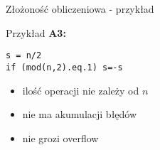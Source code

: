 \begin{frame}[fragile]{Złożoność obliczeniowa - przykład}
	\begin{exampleblock}{Przykład}
    	{\bf A3:}
    	\begin{lstlisting}[escapechar=|]
s = n/2
if (mod(n,2).eq.1) s=-s \end{lstlisting}
		\vspace{-15pt}
        \begin{itemize}
        	\item ilość operacji nie zależy od $n$
            \item nie ma akumulacji błędów
            \item nie grozi overflow
        \end{itemize}
	\end{exampleblock}
\end{frame}
